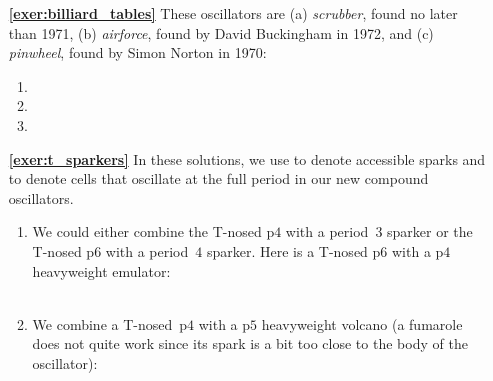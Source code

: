 \begin{multicols}{2}
\begin{itemize}[leftmargin=0em]
	\item[\bf\color{ocre}\sffamily\ref{exer:billiard_tables}] These oscillators are (a) \emph{scrubber}, found no later than 1971, (b) \emph{airforce}, found by David Buckingham in 1972, and (c) \emph{pinwheel}, found by Simon Norton in 1970: \\[-0.6em]
		\begin{enumerate}[leftmargin=1.5em,label=\bf\color{ocre}(\alph*)]
			\item {}
			
			\item {}
			
			\item {}
		\end{enumerate}
	
	
	\item[\bf\color{ocre}\sffamily\ref{exer:t_sparkers}] In these solutions, we use  to denote accessible sparks and  to denote cells that oscillate at the full period in our new compound oscillators.
	\begin{enumerate}[leftmargin=1.5em,label=\bf\color{ocre}(\alph*)]
		\item We could either combine the T-nosed p$4$ with a period~$3$ sparker or the T-nosed p$6$ with a period~$4$ sparker. Here is a T-nosed p$6$ with a p$4$ heavyweight emulator: \\[-0.6em]
		
		 \\[-0.8em]
		
		
		\item We combine a T-nosed~p$4$ with a p$5$ heavyweight volcano (a fumarole does not quite work since its spark is a bit too close to the body of the oscillator): \\[-0.6em]
		
		 \\[-0.8em]
		

\end{enumerate}
\end{itemize}
\end{multicols}
